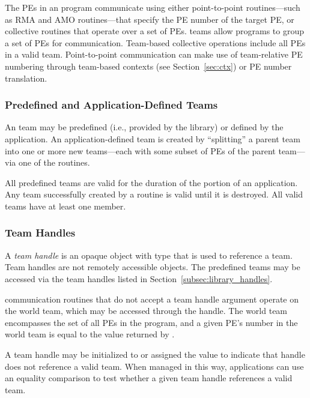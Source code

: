 The \acp{PE} in an \openshmem program communicate using either
point-to-point routines---such as \ac{RMA} and \ac{AMO} routines---that specify the \ac{PE} number of the target
\ac{PE}, or collective routines that operate over a set of \acp{PE}.
\openshmem teams allow programs to group a set of \acp{PE} for
communication.
Team-based collective operations include all \acp{PE}
in a valid team.
Point-to-point communication can make use of team-relative \ac{PE}
numbering through team-based contexts (see Section~\ref{sec:ctx}) or
\ac{PE} number translation.

\subsubsection*{Predefined and Application-Defined Teams}

An \openshmem team may be predefined (i.e., provided by the \openshmem
library) or defined by the \openshmem application.
An application-defined team is created by ``splitting'' a parent team into
one or more new teams---each with some subset of \acp{PE} of the
parent team---via one of the  routines.

All predefined teams are valid for the duration of the \openshmem
portion of an application.
Any team successfully created by a 
routine is valid until it is destroyed.
All valid teams have at least one member.

\subsubsection*{Team Handles}

A \emph{team handle} is an opaque object with type 
that is used to reference a team.
Team handles are not remotely accessible objects.
The predefined teams may be accessed via the team handles listed in
Section~\ref{subsec:library_handles}.

\openshmem communication routines that do not accept a team handle
argument operate on the world team, which may be accessed through
the  handle.
The world team encompasses the set of all \acp{PE} in the \openshmem
program, and a given \ac{PE}'s number in the world team is equal to the
value returned by .

A team handle may be initialized to or assigned the value
 to indicate that handle does not
reference a valid team.
When managed in this way, applications can use an equality comparison
to test whether a given team handle references a valid team.

